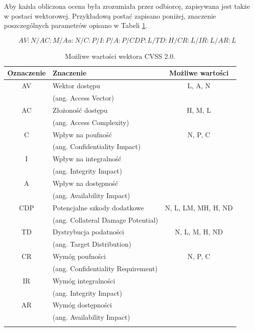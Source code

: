 \newpage
Aby każda obliczona ocena była zrozumiała przez odbiorcę, zapisywana jest także w postaci wektorowej. Przykładową postać zapisano poniżej, znaczenie poszczególnych parametrów opisano w Tabeli \ref{tab:chapter1:cvss_2_vector}.

\begin{equation}
\label{eq:chapter1:cvss_2_en_vector}
AV:N/AC:M/Au:N/C:P/I:P/A:P/CDP:L/TD:H/CR:L/IR:L/AR:L
\end{equation}

\begin{table}[tbh]
\caption{Możliwe wartości wektora CVSS 2.0.}
\begin{center}
\label{tab:chapter1:cvss_2_vector}
\begin{tabular}{clc}
\hline \noalign {\smallskip}
\textbf{Oznaczenie} & \textbf{Znaczenie} & \textbf{Możliwe wartości} \\
\hline \noalign {\smallskip}
AV & Wektor dostępu  & L, A, N \\
   & (ang. Access Vector) &        \\

\hline \noalign {\smallskip}
AC & Złożoność dostępu   &  H, M, L \\
   & (ang. Access Complexity) & \\

\hline \noalign {\smallskip}
C &  Wpływ na poufność       & N, P, C \\
  & (ang. Confidentiality Impact) & \\
I & Wpływ na integralność    & \\
  & (ang. Integrity Impact)       & \\ 
A & Wpływ na dostępność      & \\
  & (ang. Availability Impact)    & \\

\hline \noalign {\smallskip}
CDP	& Potencjalne szkody dodatkowe & N, L, LM, MH, H, ND \\
    & (ang. Collateral Damage Potential) & \\

\hline \noalign {\smallskip}
TD & Dystrybucja podatności & 	N, L, M, H, ND \\
   & (ang. Target Distribution)  & \\

\hline \noalign {\smallskip}
CR & Wymóg poufności               & N, P, C \\
   & (ang. Confidentiality Requirement) & \\
IR & Wymóg integralności           & \\
   & (ang. Integrity Impact)            & \\
AR & Wymóg dostępności             & \\
   & (ang. Availability Impact)         & \\

\hline \noalign {\smallskip}
\end{tabular}
\end{center}
\end{table}

